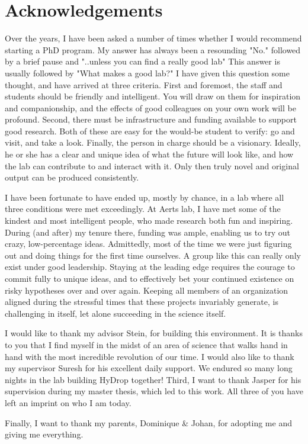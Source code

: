 \chapter*{Acknowledgements}

Over the years, I have been asked a number of times whether I would recommend starting a PhD program. My answer has always been a resounding "No."\llap{,} followed by a brief pause and "..unless you can find a really good lab" This answer is usually followed by "What makes a good lab?" I have given this question some thought, and have arrived at three criteria. First and foremost, the staff and students should be friendly and intelligent. You will draw on them for inspiration and companionship, and the effects of good colleagues on your own work will be profound. Second, there must be infrastructure and funding available to support good research. Both of these are easy for the would-be student to verify: go and visit, and take a look. Finally, the person in charge should be a visionary. Ideally, he or she has a clear and unique idea of what the future will look like, and how the lab can contribute to and interact with it. Only then truly novel and original output can be produced consistently.

I have been fortunate to have ended up, mostly by chance, in a lab where all three conditions were met exceedingly. At Aerts lab, I have met some of the kindest and most intelligent people, who made research both fun and inspiring. During (and after) my tenure there, funding was ample, enabling us to try out crazy, low-percentage ideas. Admittedly, most of the time we were just figuring out and doing things for the first time ourselves. A group like this can really only exist under good leadership. Staying at the leading edge requires the courage to commit fully to unique ideas, and to effectively bet your continued existence on risky hypotheses over and over again. Keeping all members of an organization aligned during the stressful times that these projects invariably generate, is challenging in itself, let alone succeeding in the science itself.

I would like to thank my advisor Stein, for building this environment. It is thanks to you that I find myself in the midst of an area of science that walks hand in hand with the most incredible revolution of our time. I would also like to thank my supervisor Suresh for his excellent daily support. We endured so many long nights in the lab building HyDrop together! Third, I want to thank Jasper for his supervision during my master thesis, which led to this work. All three of you have left an imprint on who I am today.

Finally, I want to thank my parents, Dominique \& Johan, for adopting me and giving me everything.